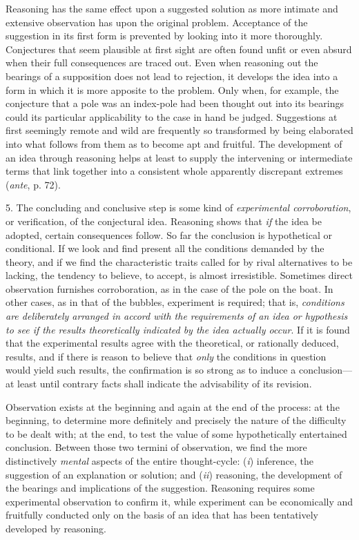 \documentclass[showtrims,ustradepaper]{memoir}
\begin{document}
Reasoning has the same effect upon a suggested solution as more intimate
and extensive observation has upon the original problem. Acceptance of
the suggestion in its first form is prevented by looking into it more
thoroughly. Conjectures that seem plausible at first sight are often
found unfit or even absurd when their full consequences are traced out.
Even when reasoning out the bearings of a supposition does not lead to
rejection, it develops the idea into a form in which it is more apposite
to the problem. Only when, for example, the conjecture that a pole was
an index-pole had been thought out into its bearings could its
particular applicability to the case in hand be judged. Suggestions at
first seemingly remote and wild are frequently so transformed by being
elaborated into what follows from them as to become apt and fruitful.
The development of an idea through reasoning helps at least to supply
the intervening or intermediate terms that link together into a
consistent whole apparently discrepant extremes (\emph{ante}, p.
72).


5. The concluding and conclusive step is some kind of \emph{experimental
corroboration}, or verification, of the conjectural idea. Reasoning
shows that \emph{if} the idea be adopted, certain consequences follow.
So far the conclusion is hypothetical or conditional. If we look and
find present all the conditions demanded by the theory, and if we find
the characteristic traits called for by rival alternatives to be
lacking, the tendency to believe, to accept, is almost irresistible.
Sometimes direct observation furnishes corroboration, as in the case of
the pole on the boat. In other cases, as in that of the bubbles,
experiment is required; that is, \emph{conditions are deliberately
arranged in accord with the requirements of an idea or hypothesis to see
if the results theoretically indicated by the idea actually occur}. If
it is found that the experimental results agree with the theoretical, or
rationally deduced, results, and if there is reason to believe that
\emph{only} the conditions in question would yield such results, the
confirmation is so strong as to induce a conclusion---at least until
contrary facts shall indicate the advisability of its revision.


Observation exists at the beginning and again at the end of the process:
at the beginning, to determine more definitely and precisely the nature
of the difficulty to be dealt with; at the end, to test the value of
some hypothetically entertained conclusion. Between those two termini of
observation, we find the more distinctively \emph{mental} aspects of the
entire thought-cycle: (\emph{i}) inference, the suggestion of an
explanation or solution; and (\emph{ii}) reasoning, the development of
the bearings and implications of the suggestion. Reasoning requires some
experimental observation to confirm it, while experiment can be
economically and fruitfully conducted
only
on the basis of an idea that has been tentatively developed by
reasoning.
\end{document}
